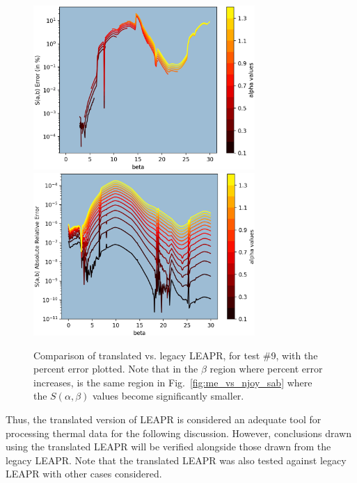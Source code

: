 \documentclass[Master.tex]{subfiles}
\begin{document}
    \begin{figure}[h]
      \begin{center}
        \includegraphics[width=0.75\textwidth]{images/me-vs-njoy-3c}
        \includegraphics[width=0.75\textwidth]{images/me-vs-njoy-4c}
        \caption[Comparison of Translated vs. Legacy LEAPR, for Test \#9 (\% Error) ]{Comparison of translated vs. legacy LEAPR, for test \#9, with the percent error plotted. Note that in the $\beta$ region where percent error increases, is the same region in Fig.~\ref{fig:me_vs_njoy_sab} where the $S(\alpha,\beta)$ values become significantly smaller.}
        \label{fig:me_vs_njoy_error}
      \end{center}
    \end{figure}



    Thus, the translated version of LEAPR is considered an adequate tool for processing thermal data for the following discussion. However, conclusions drawn using the translated LEAPR will be verified alongside those drawn from the legacy LEAPR. Note that the translated LEAPR was also tested against legacy LEAPR with other cases considered.
\end{document}
